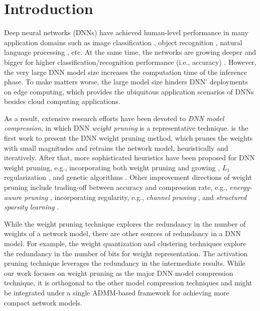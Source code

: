\documentclass{article} %
\begin{document}




\section{Introduction}

Deep neural networks (DNNs) have achieved human-level performance in many application domains such as image classification \citep{krizhevsky2012imagenet}, object recognition \citep{lecun1998,he2016deep}, natural language processing \citep{hinton2012deep,dahl2012context}, etc.
At the same time, the networks are growing deeper and bigger for higher classification/recognition performance (i.e., accuracy) \citep{simonyan2015very}.
However, the very large DNN model size increases the computation time of the inference phase.
To make matters worse, the large model size hinders DNN' deployments on edge computing, which provides the ubiquitous application scenarios of DNNs besides cloud computing applications.

As a result, extensive research efforts have been devoted to \emph{DNN model compression}, in which DNN \emph{weight pruning} is a representative technique.
\citet{han2015learning} is the first work to present the DNN weight pruning method, which prunes the weights with small magnitudes and retrains the network model, heuristically and iteratively. 
After that, more sophisticated heuristics have been proposed for DNN weight pruning, e.g., incorporating both weight pruning and growing \citep{guo2016dynamic}, $L_1$ regularization \citep{wen2016learning}, and genetic algorithms \citep{dai2017nest}.
Other improvement directions of weight pruning include trading-off between accuracy and compression rate, e.g., \emph{energy-aware pruning} \citep{yang2017designing}, incorporating regularity, e.g., \emph{channel pruning} \citep{he2017channel}, and \emph{structured sparsity learning} \citep{wen2016learning}.

 

While the weight pruning technique explores the redundancy in the number of weights of a network model, there are other sources of redundancy in a DNN model. For example, the weight quantization \citep{leng2017extremely,park2017weighted,zhou2017incremental,lin2016fixed,wu2016quantized,rastegari2016xnor,hubara2016binarized,courbariaux2015binaryconnect} and clustering \citep{zhu2017trained,han2015deep} techniques explore the redundancy in the number of bits for weight representation.
The activation pruning technique \citep{jung2018joint,sharify2018loom} leverages the redundancy in the intermediate results. %
While our work focuses on weight pruning as the major DNN model compression technique, it is orthogonal to the other model compression techniques and might be integrated under a single ADMM-based framework for achieving more compact network models.
\end{document}
